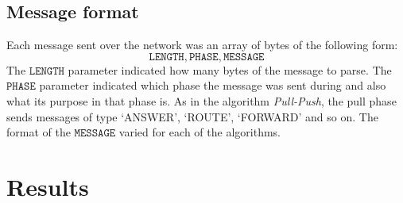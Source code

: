 \subsection{Message format}
Each message sent over the network was an array of bytes of the following form:
\begin{equation*}
    \mathtt{LENGTH}, \mathtt{PHASE}, \mathtt{MESSAGE}
\end{equation*}
The $\mathtt{LENGTH}$ parameter indicated how many bytes of the message to parse. The $\mathtt{PHASE}$ parameter indicated which phase the message was sent during and also what its purpose in that phase is. As in the algorithm \textit{Pull-Push}, the pull phase sends messages of type `ANSWER', `ROUTE', `FORWARD' and so on. The format of the $\mathtt{MESSAGE}$ varied for each of the algorithms.


\section{Results}
\label{sec:results}

